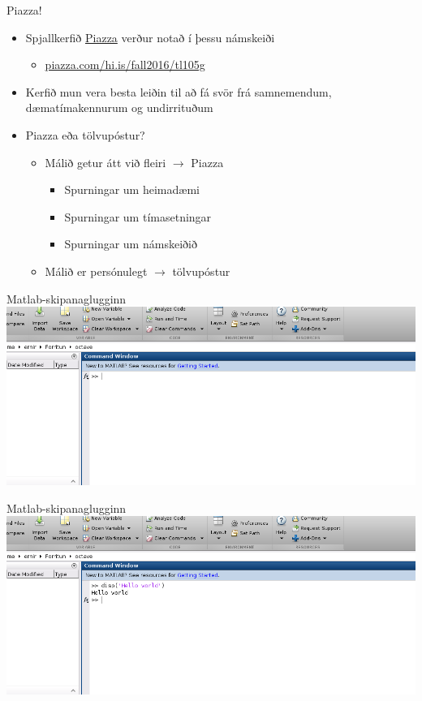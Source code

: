 \documentclass{beamer}
\begin{document}
\begin{frame}{Piazza!}
\label{frame:piazza}
\begin{itemize}
 \item Spjallkerfið \href{piazza.com/hi.is/fall2016/tl105g}{Piazza} verður notað í þessu námskeiði
 \begin{itemize}
  \item \url{piazza.com/hi.is/fall2016/tl105g}
 \end{itemize}
 \item Kerfið mun vera besta leiðin til að fá svör frá samnemendum, dæmatímakennurum og undirrituðum
 \item Piazza eða tölvupóstur?
 \begin{itemize}
  \item Málið getur átt við fleiri $\to$ Piazza
  \begin{itemize}
   \item Spurningar um heimadæmi
   \item Spurningar um tímasetningar
   \item Spurningar um námskeiðið
  \end{itemize}
  \item Málið er persónulegt $\to$ tölvupóstur
 \end{itemize}
\end{itemize}
\end{frame}

\begin{frame}{Matlab-skipanaglugginn}
\includegraphics[width=\textwidth]{Pics/command-window}
\end{frame}

\begin{frame}{Matlab-skipanaglugginn}
\includegraphics[width=\textwidth]{Pics/command-window-hello-world}
\end{frame}
\end{document}
